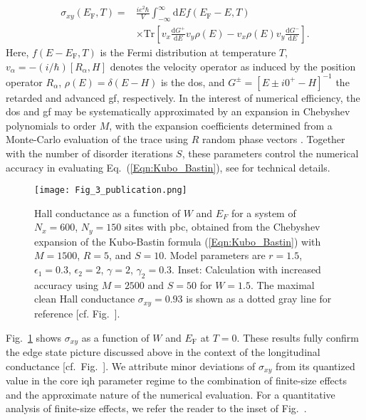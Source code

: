 \documentclass[aps,prb,amsmath,amssymb,twocolumn, superscriptaddress]{revtex4-2}
\newcommand{\eq}[1]{Eq.~(\ref{#1})}
\begin{document}
\begin{align}
\sigma_{xy}(E_\mathrm{F}, T) =& \frac{ie^2 \hbar}{V} \int_{-\infty}^\infty \mathrm{d} E f(E_\mathrm{F} - E, T)  \nonumber \\ &\times \mathrm{Tr}\left[v_x \frac{\mathrm{d} G^+}{\mathrm{d} E} v_y \rho(E) 
 - v_x  \rho(E) v_y \frac{\mathrm{d} G^-}{\mathrm{d} E}   \right].\label{Eqn:Kubo_Bastin}
\end{align}
Here, $f(E - E_\mathrm{F}, T)$ is the Fermi distribution at temperature $T$, $v_\alpha = -(i/ \hbar) [R_\alpha, H]$ denotes the velocity operator as induced by the position operator $R_\alpha$, $\rho(E) = \delta(E - H)$ is the \gls{dos}, and $G^{\pm} = [E \pm i 0^+ - H]^{-1}$ the retarded and advanced \gls{gf}, respectively. In the interest of numerical efficiency, the \gls{dos} and \gls{gf} may be systematically approximated by an expansion in Chebyshev polynomials to order $M$, with the expansion coefficients determined from a Monte-Carlo evaluation of the trace using $R$ random phase vectors \cite{Kubo_Bastin_KPM_1, Kubo_Bastin_KPM_2, KPM_Review}. Together with the number of disorder iterations $S$, these parameters control the numerical accuracy in evaluating \eq{Eqn:Kubo_Bastin}, see \cite{Supplemental} for technical details.

\begin{figure}[htp!]	 
{\texttt{[image: Fig\_3\_publication.png]}}
\caption{Hall conductance as a function of $W$ and $E_F$ for a system of $N_x = 600$, $N_y = 150$ sites with \gls{pbc}, obtained from the Chebyshev expansion of the Kubo-Bastin formula (\ref{Eqn:Kubo_Bastin}) with $M = 1500$, $R = 5$, and $S = 10$. Model parameters are $r = 1.5$, $\epsilon_1 = 0.3$, $\epsilon_2 = 2$, $\gamma  =2$, $\gamma_2 = 0.3$. Inset: Calculation with increased accuracy using $M = 2500$ and $S = 50$ for $W = 1.5$. The maximal clean Hall conductance $\sigma_{xy} = 0.93$ is shown as a dotted gray line for reference [cf.  Fig.~\protect{}].
}\label{Fig:Hall_cond}
\end{figure}

Fig.~\ref{Fig:Hall_cond} shows $\sigma_{xy}$ as a function of $W$ and $E_\mathrm{F}$ at $T = 0$. These results fully confirm the edge state picture discussed above in the context of the longitudinal conductance [cf.~Fig.~]. We attribute minor deviations of $\sigma_{xy}$ from its quantized value in the core \gls{iqh} parameter regime to the combination of finite-size effects and the approximate nature of the numerical evaluation. For a quantitative analysis of finite-size effects, we refer the reader to the inset of Fig.~.
\end{document}
